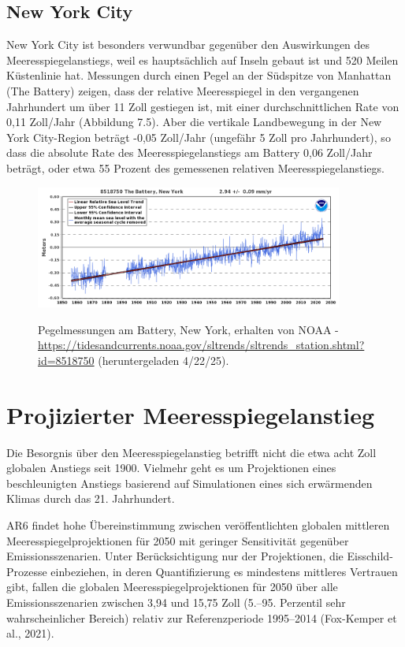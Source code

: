 \documentclass[12pt,paper=a4,DIV=12,parskip=never,chapterprefix=false,headings=standardclasses]{scrreprt}
\begin{document}
\subsection{New York City}
New York City ist besonders verwundbar gegenüber den Auswirkungen des Meeresspiegelanstiegs, weil es hauptsächlich auf Inseln gebaut ist und 520 Meilen Küstenlinie hat. Messungen durch einen Pegel an der Südspitze von Manhattan (The Battery) zeigen, dass der relative Meeresspiegel in den vergangenen Jahrhundert um über 11 Zoll gestiegen ist, mit einer durchschnittlichen Rate von 0,11 Zoll/Jahr (Abbildung 7.5). Aber die vertikale Landbewegung in der New York City-Region beträgt -0,05 Zoll/Jahr (ungefähr 5 Zoll pro Jahrhundert), so dass die absolute Rate des Meeresspiegelanstiegs am Battery 0,06 Zoll/Jahr beträgt, oder etwa 55 Prozent des gemessenen relativen Meeresspiegelanstiegs.

\begin{figure}[H]
\begin{center}
\includegraphics[width=0.9\textwidth]{bilder/bilderKlima-0072.png}\\[1cm]
\end{center}
\caption{Pegelmessungen am Battery, New York, erhalten von NOAA - \url{https://tidesandcurrents.noaa.gov/sltrends/sltrends_station.shtml?id=8518750} (heruntergeladen 4/22/25).}
\end{figure}

\section{Projizierter Meeresspiegelanstieg}
Die Besorgnis über den Meeresspiegelanstieg betrifft nicht die etwa acht Zoll globalen Anstiegs seit 1900. Vielmehr geht es um Projektionen eines beschleunigten Anstiegs basierend auf Simulationen eines sich erwärmenden Klimas durch das 21. Jahrhundert.

AR6 findet hohe Übereinstimmung zwischen veröffentlichten globalen mittleren Meeresspiegelprojektionen für 2050 mit geringer Sensitivität gegenüber Emissionsszenarien. Unter Berücksichtigung nur der Projektionen, die Eisschild-Prozesse einbeziehen, in deren Quantifizierung es mindestens mittleres Vertrauen gibt, fallen die globalen Meeresspiegelprojektionen für 2050 über alle Emissionsszenarien zwischen 3,94 und 15,75 Zoll (5.–95. Perzentil sehr wahrscheinlicher Bereich) relativ zur Referenzperiode 1995–2014 (Fox-Kemper et al., 2021).
\end{document}
